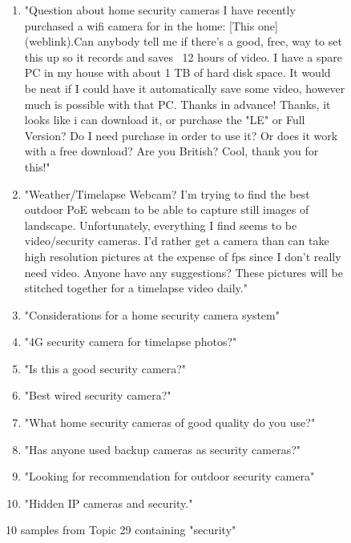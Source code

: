 \documentclass{article}
\begin{document}
    \begin{figure}[H]
        \begin{footnotesize}
        \begin{enumerate}
            \item "Question about home security cameras I have recently purchased a wifi camera for in the home: [This one](weblink).Can anybody tell me if there's a good, free, way to set this up so it records and saves ~12 hours of video. I have a spare PC in my house with about 1 TB of hard disk space. It would be neat if I could have it automatically save some video, however much is possible with that PC. Thanks in advance! Thanks, it looks like i can download it, or purchase the "LE" or Full Version? Do I need purchase in order to use it? Or does it work with a free download? Are you British? Cool, thank you for this!"
            \item "Weather/Timelapse Webcam? I'm trying to find the best outdoor PoE webcam to be able to capture still images of landscape.  Unfortunately, everything I find seems to be video/security cameras.  I'd rather get a camera than can take high resolution pictures at the expense of fps since I don't really need video.  Anyone have any suggestions? These pictures will be stitched together for a timelapse video daily."
            \item "Considerations for a home security camera system"
            \item "4G security camera for timelapse photos?"
            \item "Is this a good security camera?"
            \item "Best wired security camera?"
            \item "What home security cameras of good quality do you use?"
            \item "Has anyone used backup cameras as security cameras?"
            \item "Looking for recommendation for outdoor security camera"
            \item "Hidden IP cameras and security."
        \end{enumerate}
    \end{footnotesize}
        \caption{10 samples from Topic 29 containing "security"}
    \end{figure}

    

    
\end{document}
